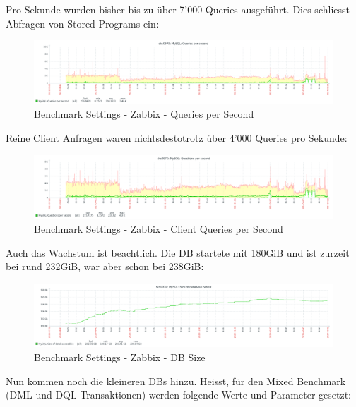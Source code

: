 \begin{flushleft}
    Pro Sekunde wurden bisher bis zu über 7'000 Queries ausgeführt.
    Dies schliesst Abfragen von Stored Programs ein:
    \begin{figure}[H]
        \centering
        \includegraphics[width=0.8\linewidth]{source/implementation/evaluation/benchmarking/sks0970_zabbix_mariadb_queries_per_second_graph}
        \caption{Benchmark Settings - Zabbix - Queries per Second}
        \label{fig:sks0970_zabbix_mariadb_queries_per_second_graph}
    \end{figure}
    Reine Client Anfragen waren nichtsdestotrotz über 4'000 Queries pro Sekunde:
    \begin{figure}[H]
        \centering
        \includegraphics[width=0.8\linewidth]{source/implementation/evaluation/benchmarking/sks0970_zabbix_mariadb_questions_per_second_graph}
        \caption{Benchmark Settings - Zabbix - Client Queries per Second}
        \label{fig:sks0970_zabbix_mariadb_questions_per_second_graph}
    \end{figure}
\end{flushleft}
\begin{flushleft}
    Auch das Wachstum ist beachtlich.
    Die DB startete mit 180GiB und ist zurzeit bei rund 232GiB, war aber schon bei 238GiB:
    \begin{figure}[H]
        \centering
        \includegraphics[width=0.8\linewidth]{source/implementation/evaluation/benchmarking/sks0970_zabbix_mariadb_size_graph}
        \caption{Benchmark Settings - Zabbix - DB Size}
        \label{fig:sks0970_zabbix_mariadb_size_graph}
    \end{figure}
\end{flushleft}
\begin{flushleft}
    Nun kommen noch die kleineren DBs hinzu.
    Heisst, für den Mixed Benchmark (DML und DQL \Gls{Transaktion}en) werden folgende Werte und Parameter gesetzt:
    
\end{flushleft}
